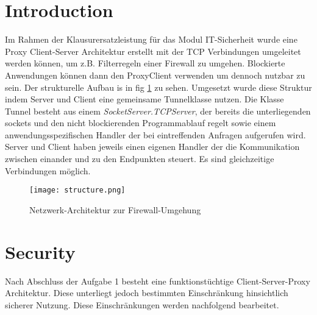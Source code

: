 \documentclass[12pt, a4paper]{scrartcl}
\begin{document}


\tableofcontents
\newpage
{}
\setcounter{lastroman}{\value{page}}

\pagestyle{plain}
\maketitle

\section{Introduction}
Im Rahmen der Klausurersatzleistung für das Modul IT-Sicherheit wurde eine Proxy Client-Server Architektur erstellt mit der TCP Verbindungen umgeleitet werden können, um z.B. Filterregeln einer Firewall zu umgehen. Blockierte Anwendungen können dann den ProxyClient verwenden um dennoch nutzbar zu sein. Der strukturelle Aufbau is in fig \ref{fig::arch} zu sehen.\newline
Umgesetzt wurde diese Struktur indem Server und Client eine gemeinsame Tunnelklasse nutzen. Die Klasse Tunnel besteht aus einem \textit{SocketServer.TCPServer}, der bereits die unterliegenden sockets und den nicht blockierenden Programmablauf regelt sowie einem anwendungsspezifischen Handler der bei eintreffenden Anfragen aufgerufen wird. Server und Client haben jeweils einen eigenen Handler der die Kommunikation zwischen einander und zu den Endpunkten steuert. Es sind gleichzeitige Verbindungen möglich.

\begin{figure}[H]
    \centering
    \texttt{[image: structure.png]}
    \caption{Netzwerk-Architektur zur Firewall-Umgehung}
    \label{fig::arch}
\end{figure}

\section{Security}
Nach Abschluss der Aufgabe 1 besteht eine funktionstüchtige Client-Server-Proxy Architektur. Diese unterliegt jedoch bestimmten Einschränkung hinsichtlich sicherer Nutzung. Diese Einschränkungen werden nachfolgend bearbeitet.
\end{document}
